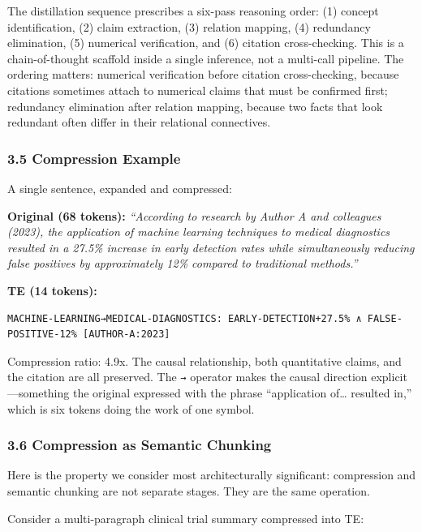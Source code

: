 \documentclass[
]{article}
\begin{document}
The distillation sequence prescribes a six-pass reasoning order: (1)
concept identification, (2) claim extraction, (3) relation mapping, (4)
redundancy elimination, (5) numerical verification, and (6) citation
cross-checking. This is a chain-of-thought scaffold inside a single
inference, not a multi-call pipeline. The ordering matters: numerical
verification before citation cross-checking, because citations sometimes
attach to numerical claims that must be confirmed first; redundancy
elimination after relation mapping, because two facts that look
redundant often differ in their relational connectives.

\subsubsection{3.5 Compression Example}\label{compression-example}

A single sentence, expanded and compressed:

\textbf{Original (68 tokens):} \emph{``According to research by Author A
and colleagues (2023), the application of machine learning techniques to
medical diagnostics resulted in a 27.5\% increase in early detection
rates while simultaneously reducing false positives by approximately
12\% compared to traditional methods.''}

\textbf{TE (14 tokens):}

\begin{verbatim}
MACHINE-LEARNING→MEDICAL-DIAGNOSTICS: EARLY-DETECTION+27.5% ∧ FALSE-POSITIVE-12% [AUTHOR-A:2023]
\end{verbatim}

Compression ratio: 4.9x. The causal relationship, both quantitative
claims, and the citation are all preserved. The \texttt{→} operator
makes the causal direction explicit---something the original expressed
with the phrase ``application of\ldots{} resulted in,'' which is six
tokens doing the work of one symbol.

\subsubsection{3.6 Compression as Semantic
Chunking}\label{compression-as-semantic-chunking}

Here is the property we consider most architecturally significant:
compression and semantic chunking are not separate stages. They are the
same operation.

Consider a multi-paragraph clinical trial summary compressed into TE:
\end{document}
